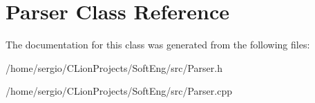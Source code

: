 \hypertarget{class_parser}{}\section{Parser Class Reference}
\label{class_parser}


The documentation for this class was generated from the following files\+:\begin{DoxyCompactItemize}
\item 
/home/sergio/\+C\+Lion\+Projects/\+Soft\+Eng/src/Parser.\+h\item 
/home/sergio/\+C\+Lion\+Projects/\+Soft\+Eng/src/Parser.\+cpp\end{DoxyCompactItemize}
